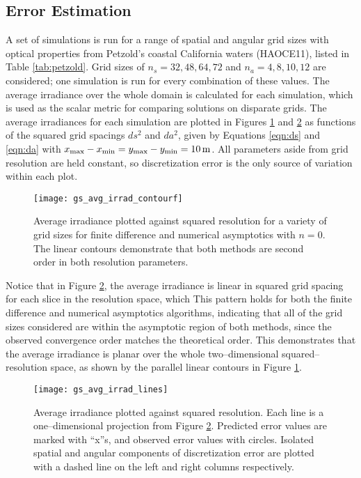 \subsection{Error Estimation}
A set of simulations is run for a range of spatial and angular grid sizes with optical properties from Petzold's coastal California waters (HAOCE11), listed in Table \ref{tab:petzold}.
Grid sizes of $n_s=32,48,64,72$ and $n_a=4,8,10,12$ are considered; one simulation is run for every combination of these values.
The average irradiance over the whole domain is calculated for each simulation, which is used as the scalar metric for comparing solutions on disparate grids.
The average irradiances for each simulation are plotted in Figures \ref{fig:gs_avg_irrad_contourf} and \ref{fig:gs_avg_irrad_lines} as functions of the squared grid spacings $ds^2$ and $da^2$, given by Equations \eqref{eqn:ds} and \eqref{eqn:da} with $\xmax-\xmin = \ymax-\ymin = \SI{10}{\m}$.
All parameters aside from grid resolution are held constant, so discretization error is the only source of variation within each plot.

\begin{figure}[H]
  \centering
  \texttt{[image: gs\_avg\_irrad\_contourf]}
  \caption{Average irradiance plotted against squared resolution for a variety of grid sizes for finite difference and numerical asymptotics with $n=0$. The linear contours demonstrate that both methods are second order in both resolution parameters.}
  \label{fig:gs_avg_irrad_contourf}
\end{figure}

Notice that in Figure \ref{fig:gs_avg_irrad_lines}, the average irradiance is linear in squared grid spacing for each slice in the resolution space, which 
This pattern holds for both the finite difference and numerical asymptotics algorithms, indicating that all of the grid sizes considered are within the asymptotic region of both methods, since the observed convergence order matches the theoretical order.
This demonstrates that the average irradiance is planar over the whole two--dimensional squared--resolution space, as shown by the parallel linear contours in Figure \ref{fig:gs_avg_irrad_contourf}.


\begin{figure}[H]
  \centering
  \texttt{[image: gs\_avg\_irrad\_lines]}
  \caption{Average irradiance plotted against squared resolution. Each line is a one--dimensional projection from Figure \ref{fig:gs_avg_irrad_lines}. Predicted error values are marked with ``x''s, and observed error values with circles. Isolated spatial and angular components of discretization error are plotted with a dashed line on the left and right columns respectively.}
  \label{fig:gs_avg_irrad_lines}
\end{figure}



